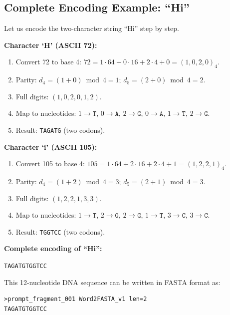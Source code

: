 \subsection{Complete Encoding Example: ``Hi''}

Let us encode the two-character string ``Hi'' step by step.

\medskip
\noindent\textbf{Character `H' (ASCII 72):}
\begin{enumerate}[leftmargin=1.8em]
  \item Convert 72 to base 4: $72 = 1 \cdot 64 + 0 \cdot 16 + 2 \cdot 4 + 0 = (1, 0, 2, 0)_4$.
  \item Parity: $d_4 = (1 + 0) \bmod 4 = 1$; $d_5 = (2 + 0) \bmod 4 = 2$.
  \item Full digits: $(1, 0, 2, 0, 1, 2)$.
  \item Map to nucleotides: $1\!\to\!\texttt{T}$, $0\!\to\!\texttt{A}$, $2\!\to\!\texttt{G}$, $0\!\to\!\texttt{A}$, $1\!\to\!\texttt{T}$, $2\!\to\!\texttt{G}$.
  \item Result: \texttt{TAG\;ATG} (two codons).
\end{enumerate}

\noindent\textbf{Character `i' (ASCII 105):}
\begin{enumerate}[leftmargin=1.8em]
  \item Convert 105 to base 4: $105 = 1 \cdot 64 + 2 \cdot 16 + 2 \cdot 4 + 1 = (1, 2, 2, 1)_4$.
  \item Parity: $d_4 = (1 + 2) \bmod 4 = 3$; $d_5 = (2 + 1) \bmod 4 = 3$.
  \item Full digits: $(1, 2, 2, 1, 3, 3)$.
  \item Map to nucleotides: $1\!\to\!\texttt{T}$, $2\!\to\!\texttt{G}$, $2\!\to\!\texttt{G}$, $1\!\to\!\texttt{T}$, $3\!\to\!\texttt{C}$, $3\!\to\!\texttt{C}$.
  \item Result: \texttt{TGG\;TCC} (two codons).
\end{enumerate}

\noindent\textbf{Complete encoding of ``Hi'':}
\begin{center}
\texttt{TAG\;ATG\;TGG\;TCC}
\end{center}
This 12-nucleotide DNA sequence can be written in FASTA format as:

\begin{lstlisting}[style=dogmapython, caption={FASTA encoding of ``Hi''.}, numbers=none]
>prompt_fragment_001 Word2FASTA_v1 len=2
TAGATGTGGTCC
\end{lstlisting}

